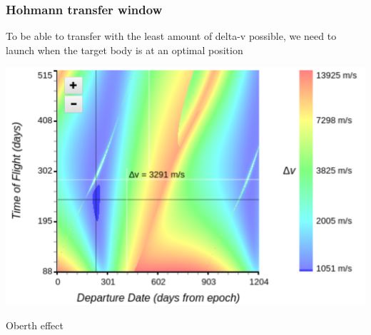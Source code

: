 \begin{frame}
    \frametitle{Hohmann transfer window}
    \begin{block}{}
        To be able to transfer with the least amount of delta-v possible, we need to launch when the target body is
        at an optimal position
    \end{block}
    \begin{block}{}
        \begin{center}
            \includegraphics[scale=0.08]{images/hohmann_transfer_window}
        \end{center}
    \end{block}
\end{frame}
{
%
\begin{frame}[t]{Oberth effect}
\end{frame}
}
